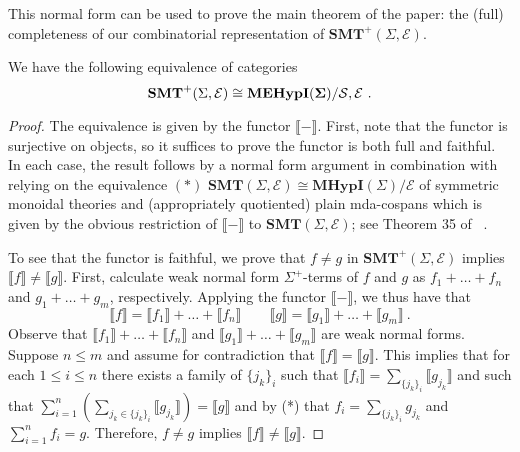 This normal form can be used to prove the main theorem of the paper: the (full) completeness of our combinatorial representation of $\textbf{SMT}^{+}(\Sigma, \mathcal {E} )$. 
\begin{theorem}
We have the following equivalence of categories
\[
	\textbf{SMT}^{+}(\Sigma, \mathcal {E} ) \cong {\mathbf{MEHypI(\Sigma)}} / \mathcal{S,E}~.
\]
\end{theorem}
\begin{proof}
The equivalence is given by the functor $\llbracket - \rrbracket$.  First, note that the functor is surjective on objects,  so it suffices to prove the functor is both full and faithful.  In each case,  the result follows by a normal form argument in combination with relying on the equivalence $(*)$ $\textbf{SMT}(\Sigma, \mathcal E) \cong \textbf{MHypI}(\Sigma)/\mathcal{E}$ of symmetric monoidal theories and (appropriately quotiented) plain mda-cospans which is given by the obvious restriction of $\llbracket - \rrbracket$ to $\textbf{SMT}(\Sigma, \mathcal E)$; see Theorem 35 of ~\cite{bonchi_string_2022-2}.  

To see that the functor is faithful,  we prove that $f \neq g$ in $\textbf{SMT}^+(\Sigma, \mathcal E)$ implies $\llbracket f \rrbracket \neq \llbracket g \rrbracket$.  First,  calculate weak normal form $\Sigma^+$-terms of $f$ and $g$ as $f_1 + \ldots + f_n$ and $g_1 + \ldots + g_m$,  respectively.  Applying the functor $\llbracket - \rrbracket$,  we thus have that
\[
	\llbracket f \rrbracket = \llbracket f_1 \rrbracket + \ldots + \llbracket f_n \rrbracket \qquad
	\llbracket g \rrbracket = \llbracket g_1 \rrbracket + \ldots + \llbracket g_m \rrbracket ~ . 
\]
Observe that $\llbracket f_1 \rrbracket + \ldots + \llbracket f_n \rrbracket$ and $\llbracket g_1 \rrbracket + \ldots + \llbracket g_m \rrbracket$ are weak normal forms.  
Suppose $n \leq m$ and assume for contradiction that $\llbracket f \rrbracket = \llbracket g \rrbracket$. 
This implies that for each $1 \leq i \leq n$ there exists a family of $\{j_k\}_{i}$ such that $\llbracket f_{i} \rrbracket = \sum\limits_{\{j_{k}\}_{i}}\llbracket g_{j_{k}} \rrbracket$ and such that $\sum\limits_{i=1}^{n}(\sum\limits_{j_{k} \in \{j_{k}\}_{i}} \llbracket g_{j_{k}} \rrbracket) = \llbracket g \rrbracket$ and by (*) that $f_{i} = \sum\limits_{\{j_{k}\}_{i}}g_{j_{k}}$ and $\sum\limits_{i=1}^{n}f_{i} = g$.
Therefore, $f \neq g$ implies $\llbracket f \rrbracket \neq \llbracket g \rrbracket$.


\end{proof}
